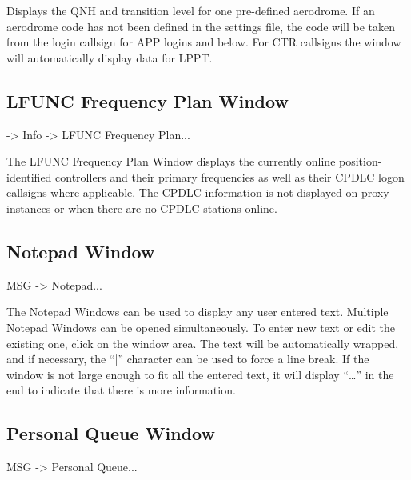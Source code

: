 \documentclass[a4paper,oneside,11pt]{memoir}
\begin{document}

Displays the QNH and transition level for one pre-defined aerodrome. If an aerodrome code has not been defined in the settings file, the code will be taken from the login callsign for APP logins and below. For CTR callsigns the window will automatically display data for LPPT.

\subsection{LFUNC Frequency Plan Window}
\label{win:lfunc}

 -> Info -> LFUNC Frequency Plan...

\bigskip


The LFUNC Frequency Plan Window displays the currently online position-identified controllers and their primary frequencies as well as their CPDLC logon callsigns where applicable. The CPDLC information is not displayed on proxy instances or when there are no CPDLC stations online.

\subsection{Notepad Window}
\label{win:note}

 MSG -> Notepad...

\bigskip


The Notepad Windows can be used to display any user entered text. Multiple Notepad Windows can be opened simultaneously. To enter new text or edit the existing one, click on the window area. The text will be automatically wrapped, and if necessary, the “|” character can be used to force a line break. If the window is not large enough to fit all the entered text, it will display “…” in the end to indicate that there is more information.

\subsection{Personal Queue Window}
\label{win:pqw}

 MSG -> Personal Queue...

\bigskip

\end{document}
